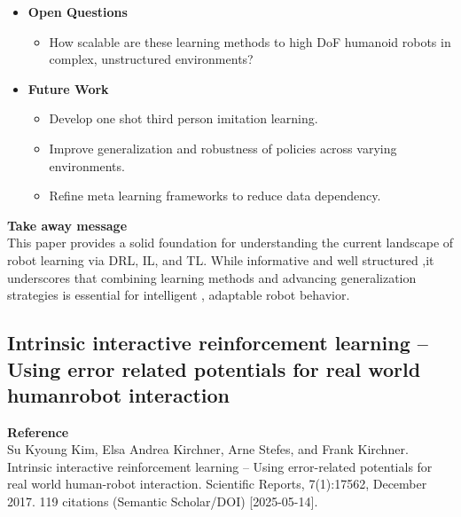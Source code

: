 \documentclass[report.tex]{subfiles}
\begin{document}
\begin{itemize}
    \item \noindent\textbf {Open Questions}
    \begin{itemize}
        \item How scalable are these learning methods to high DoF humanoid robots in complex,
unstructured environments?
    \end{itemize}
    
    \item \noindent\textbf{Future Work}
    \begin{itemize}
        \item Develop one shot third person imitation learning.
        \item Improve generalization and robustness of policies across varying environments.
        \item Refine meta learning frameworks to reduce data dependency.
    \end{itemize}
\end{itemize}


\noindent\textbf{Take away message}  \\
This paper provides a solid foundation for understanding the current landscape of robot
learning via DRL, IL, and TL. While informative and well structured ,it underscores that combining learning methods and advancing generalization strategies is
essential for intelligent , adaptable robot behavior.




















\subsection{Intrinsic interactive reinforcement  learning – Using error related  potentials for real world humanrobot interaction} 

\noindent\textbf{Reference} \\
\cite{kim_intrinsic_2017}Su Kyoung Kim, Elsa Andrea Kirchner, Arne Stefes, and Frank Kirchner. Intrinsic interactive
reinforcement learning – Using error-related potentials for real world human-robot interaction.
Scientific Reports, 7(1):17562, December 2017. 119 citations (Semantic Scholar/DOI) [2025-05-14].
\\
\end{document}
